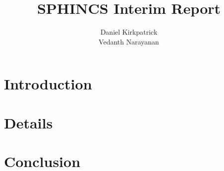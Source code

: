 \documentclass[]{scrartcl}
\title{SPHINCS Interim Report}
\author{Daniel Kirkpatrick\\Vedanth Narayanan}
\begin{document}
\maketitle


\section*{Introduction}

\section*{Details}

\section*{Conclusion}
\end{document}
